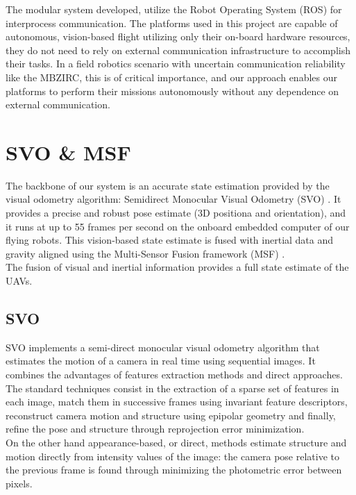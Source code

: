 The modular system developed, utilize the Robot Operating System (ROS) \cite{ros} for interprocess communication. The platforms used in this project are capable of autonomous, vision-based flight utilizing only their on-board hardware resources, they do not need to rely on external communication infrastructure to accomplish their tasks. In a field robotics scenario with uncertain communication reliability like the MBZIRC, this is of critical importance, and our approach enables our platforms to perform their missions
autonomously without any dependence on external communication.

\section{SVO \& MSF} \label{sec:state_estimation}
The backbone of our system is an accurate state estimation provided by the visual odometry algorithm: Semidirect Monocular Visual Odometry (SVO) \cite{forster2014svo}. It provides a precise and robust pose estimate (3D positiona and orientation), and it runs at up to 55 frames per second on the onboard embedded computer of our flying robots. This vision-based state estimate is fused with inertial data and gravity aligned using the Multi-Sensor Fusion framework (MSF) \cite{lynen2013robust}.\\
The fusion of visual and inertial information provides a full state estimate of the UAVs.\\


\subsection{SVO}

SVO implements a semi-direct monocular visual odometry algorithm that estimates the motion of a camera in real time using sequential images. It combines the advantages of features extraction methods and direct approaches.\\
The standard techniques consist in the extraction of a sparse set of features in each image, match them in successive frames using invariant feature descriptors, reconstruct camera motion and structure using epipolar geometry and finally, refine the pose and structure through reprojection error minimization. \\
On the other hand appearance-based, or direct, methods estimate structure and motion directly from intensity values of the image: the camera pose relative to the previous frame is found through minimizing the photometric error between pixels.\\

